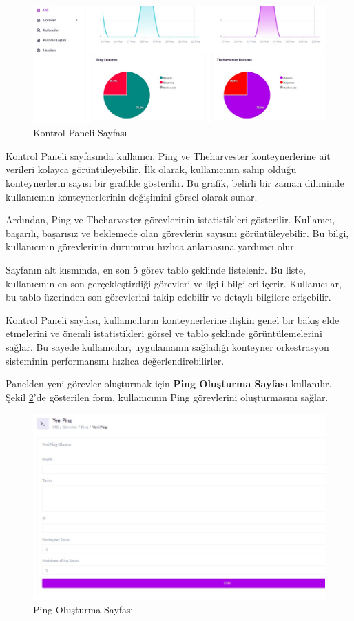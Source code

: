 \begin{figure}[ht]
  \centering
  \includegraphics[width=0.6\linewidth]{images/dashboard.jpeg}
  \caption{Kontrol Paneli Sayfası}
  \label{fig:dashboard}
\end{figure}

Kontrol Paneli sayfasında kullanıcı, Ping ve Theharvester konteynerlerine ait verileri kolayca görüntüleyebilir. İlk olarak, kullanıcının sahip olduğu konteynerlerin sayısı bir grafikle gösterilir. Bu grafik, belirli bir zaman diliminde kullanıcının konteynerlerinin değişimini görsel olarak sunar.

Ardından, Ping ve Theharvester görevlerinin istatistikleri gösterilir. Kullanıcı, başarılı, başarısız ve beklemede olan görevlerin sayısını görüntüleyebilir. Bu bilgi, kullanıcının görevlerinin durumunu hızlıca anlamasına yardımcı olur.

Sayfanın alt kısmında, en son 5 görev tablo şeklinde listelenir. Bu liste, kullanıcının en son gerçekleştirdiği görevleri ve ilgili bilgileri içerir. Kullanıcılar, bu tablo üzerinden son görevlerini takip edebilir ve detaylı bilgilere erişebilir.

Kontrol Paneli sayfası, kullanıcıların konteynerlerine ilişkin genel bir bakış elde etmelerini ve önemli istatistikleri görsel ve tablo şeklinde görüntülemelerini sağlar. Bu sayede kullanıcılar, uygulamanın sağladığı konteyner orkestrasyon sisteminin performansını hızlıca değerlendirebilirler.

Panelden yeni görevler oluşturmak için \textbf{Ping Oluşturma Sayfası} kullanılır. Şekil \ref{fig:create}'de gösterilen form, kullanıcının Ping görevlerini oluşturmasını sağlar.

\begin{figure}[ht]
  \centering
  \includegraphics[width=0.6\linewidth]{images/create.jpeg}
  \caption{Ping Oluşturma Sayfası}
  \label{fig:create}
\end{figure}

